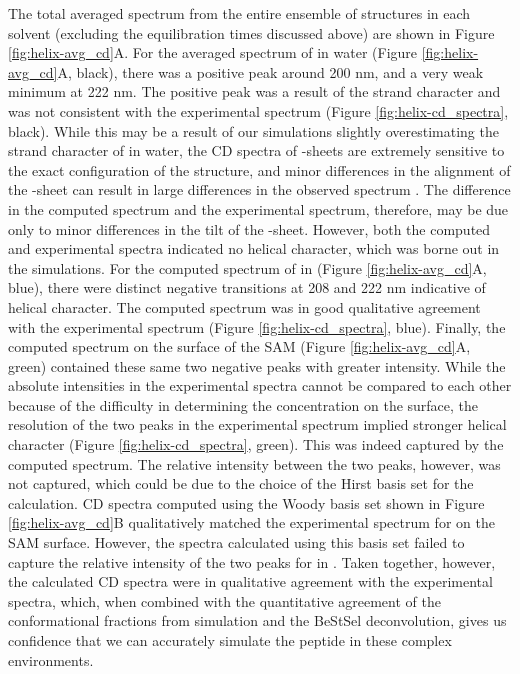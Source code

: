 The total averaged spectrum from the entire ensemble of structures in each solvent (excluding the equilibration times discussed above) are shown in Figure \ref{fig:helix-avg_cd}A. 
For the averaged spectrum of \pep{} in water (Figure \ref{fig:helix-avg_cd}A, black), there was a positive peak around 200 nm, and a very weak minimum at 222 nm. 
The positive peak was a result of the strand character and was not consistent with the experimental spectrum (Figure \ref{fig:helix-cd_spectra}, black). 
While this may be a result of our simulations slightly overestimating the strand character of \pep{} in water, the CD spectra of \textbeta{}-sheets are extremely sensitive to the exact configuration of the structure, and minor differences in the alignment of the \textbeta{}-sheet can result in large differences in the observed spectrum \cite{Micsonai2015}.
The difference in the computed spectrum and the experimental spectrum, therefore, may be due only to minor differences in the tilt of the \textbeta{}-sheet. 
However, both the computed and experimental spectra indicated no helical character, which was borne out in the simulations. 
For the computed spectrum of \pep{} in \tbawat{} (Figure \ref{fig:helix-avg_cd}A, blue), there were distinct negative transitions at 208 and 222 nm indicative of helical character. 
The computed spectrum was in good qualitative agreement with the experimental spectrum (Figure \ref{fig:helix-cd_spectra}, blue). 
Finally, the computed spectrum \pep{} on the surface of the SAM (Figure \ref{fig:helix-avg_cd}A, green) contained these same two negative peaks with greater intensity. 
While the absolute intensities in the experimental spectra cannot be compared to each other because of the difficulty in determining the concentration on the surface, the resolution of the two peaks in the experimental spectrum implied stronger helical character (Figure \ref{fig:helix-cd_spectra}, green). 
This was indeed captured by the computed spectrum. 
The relative intensity between the two peaks, however, was not captured, which could be due to the choice of the Hirst basis set\cite{Hirst1998, Besley1999} for the calculation. 
CD spectra computed using the Woody basis set\cite{Woody1999} shown in Figure \ref{fig:helix-avg_cd}B qualitatively matched the experimental spectrum for \pep{} on the SAM surface. 
However, the spectra calculated using this basis set failed to capture the relative intensity of the two peaks for \pep{} in \tbawat{}. 
Taken together, however, the calculated CD spectra were in qualitative agreement with the experimental spectra, which, when combined with the quantitative agreement of the conformational fractions from simulation and the BeStSel deconvolution, gives us confidence that we can accurately simulate the peptide in these complex environments.

